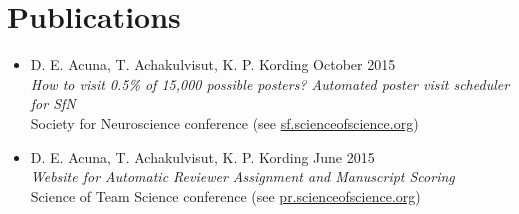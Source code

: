 \section{\sc Publications}

\begin{itemize}[leftmargin=0cm, label={}]

\item D. E. Acuna, T. Achakulvisut, K. P. Kording \hfill October 2015\\
{\em How to visit 0.5\% of 15,000 possible posters? Automated poster visit scheduler for SfN}\\ Society for Neuroscience conference (see \href{http://sf.scienceofscience.org/}{sf.scienceofscience.org})

\item D. E. Acuna, T. Achakulvisut, K. P. Kording \hfill June 2015\\
{\em Website for Automatic Reviewer Assignment and Manuscript Scoring}\\
Science of Team Science conference (see \href{http://pr.scienceofscience.org/}{pr.scienceofscience.org})

\end{itemize}
